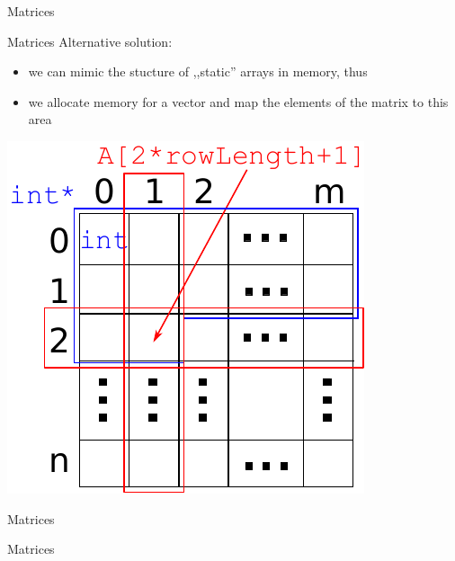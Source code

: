 \documentclass[usenames,dvipsnames,aspectratio=169]{beamer}
\begin{document}
\begin{frame}{Matrices}
  \begin{exampleblock}{}
    \footnotesize
    
    
  \end{exampleblock}
\end{frame}

\begin{frame}{Matrices}
  Alternative solution:
  \begin{itemize}
    \item we can mimic the stucture of ,,static'' arrays in memory, thus
    \item we allocate memory for a vector and map the elements of the matrix to this area
  \end{itemize}
  \begin{center}
    \includegraphics[scale=0.6]{matrix3.pdf}
  \end{center}
\end{frame}

\begin{frame}{Matrices}
  \footnotesize
  \begin{exampleblock}{}
    \vspace{-.3cm}
    
    \vspace{-.3cm}
  \end{exampleblock}
\end{frame}

\begin{frame}{Matrices}
  \scriptsize
  \begin{exampleblock}{}
    \vspace{-.3cm}
    
    \vspace{-.3cm}
  \end{exampleblock}
\end{frame}
\end{document}
